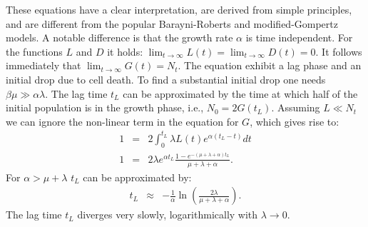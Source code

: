 \documentclass[10pt,A4paper]{article}
\numberwithin{equation}{section}
\begin{document}
These equations have a clear interpretation, are derived from simple principles, and are different from the popular Barayni-Roberts and modified-Gompertz models.
A notable difference is that the growth rate $\alpha$ is time independent.
For the functions $L$ and $D$ it holds: $\lim_{t\to\infty} L(t) = \lim_{t\to\infty} D(t) = 0$.
It follows immediately that $\lim_{t\to\infty} G(t) = N_t$.
The equation exhibit a lag phase and an initial drop due to cell death.
To find a substantial initial drop one needs $\beta \mu \gg \alpha \lambda$.
The lag time $t_L$ can be approximated by the time at which half of the initial population is in the growth phase, i.e., $N_0=2G(t_L)$.
Assuming $L\ll N_t$ we can ignore the non-linear term in the equation for $G$, which gives rise to:
\begin{eqnarray}
    1&=& 2\int_0^{t_L} \lambda L(t)e^{\alpha(t_L-t)}dt\\
    1  &=& 2\lambda e^{\alpha t_L}\frac{1-e^{-(\mu+\lambda+\alpha)t_L}}{\mu+\lambda+\alpha}.
\label{eq:lagtime_deriv3}
\end{eqnarray}
For $\alpha > \mu+\lambda$ $t_L$ can be approximated by:
\begin{eqnarray}
    t_L &\approx& -\frac{1}{\alpha}\ln\left(\frac{2\lambda}{\mu+\lambda+\alpha}\right).
\label{eq:lagtime}
\end{eqnarray}
The lag time $t_L$ diverges very slowly, logarithmically with $\lambda\to 0$.
%
%
%
\end{document}
